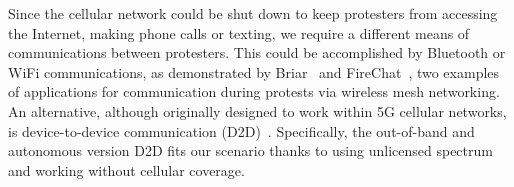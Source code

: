 
Since the cellular network could be shut down to keep protesters from accessing the Internet, making phone calls or texting, we require a different means of communications between protesters. 
This could be accomplished by Bluetooth or WiFi communications, as demonstrated by Briar~\cite{Briar} and FireChat~\cite{FireChat}, two examples of applications for communication during protests via wireless mesh networking. 
An alternative, although originally designed to work within 5G cellular networks, is device-to-device communication (D2D)~\cite{D2D}. 
Specifically, the out-of-band and autonomous version D2D fits our scenario thanks to using unlicensed spectrum and working without cellular coverage.